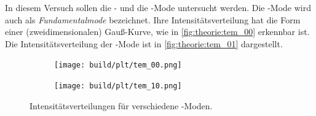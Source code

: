     In diesem Versuch sollen die - und die -Mode untersucht werden.
    Die -Mode wird auch als \textit{Fundamentalmode} bezeichnet.
    Ihre Intensitätsverteilung hat die Form einer (zweidimensionalen) Gauß-Kurve,
    wie in \autoref{fig:theorie:tem_00} erkennbar ist.
    Die Intensitätsverteilung der -Mode ist in \autoref{fig:theorie:tem_01} dargestellt.

    \begin{figure}
    \centering
    \begin{subfigure}{.5\textwidth}
        \centering
        \texttt{[image: build/plt/tem\_00.png]}
        \caption{}
        \label{fig:theorie:tem_00}
    \end{subfigure}%
    \begin{subfigure}{.5\textwidth}
        \centering
        \texttt{[image: build/plt/tem\_10.png]}
        \caption{}
        \label{fig:theorie:tem_01}
    \end{subfigure}
    \caption{Intensitätsverteilungen für verschiedene \TEM{}-Moden.}
    \label{fig:theorie:tem}
    \end{figure}
